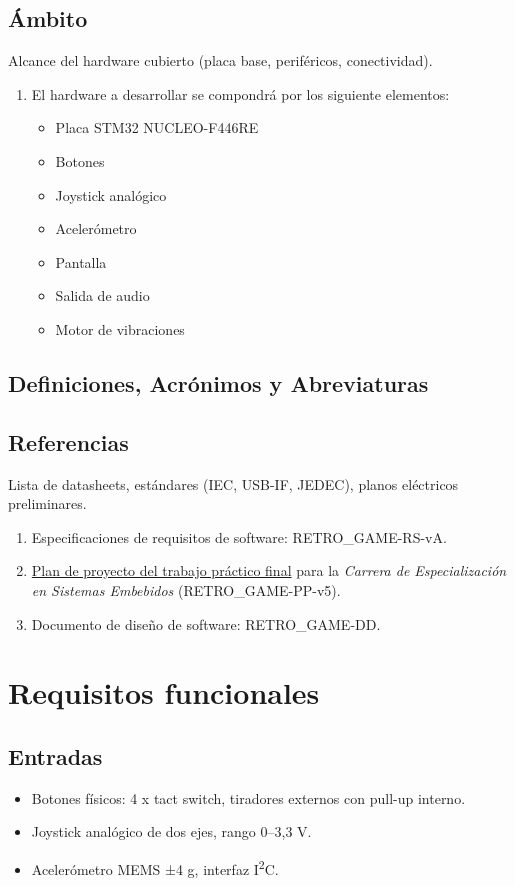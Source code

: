 \documentclass[11pt,a4paper]{article}
\begin{document}
\subsection{Ámbito}
Alcance del hardware cubierto (placa base, periféricos, conectividad).
\begin{enumerate}
  \item El hardware a desarrollar se compondrá por los siguiente elementos:
  \begin{itemize}
    \item Placa STM32 NUCLEO-F446RE
    \item Botones
    \item Joystick analógico
    \item Acelerómetro
    \item Pantalla
    \item Salida de audio
    \item Motor de vibraciones
  \end{itemize}
\end{enumerate}

\subsection{Definiciones, Acrónimos y Abreviaturas}

\subsection{Referencias}
Lista de datasheets, estándares (IEC, USB-IF, JEDEC), planos eléctricos preliminares.

\begin{enumerate}
  \item Especificaciones de requisitos de software: RETRO\_GAME-RS-vA.
  \item \href{https://drive.google.com/file/d/1C3vEYR8wME6EzlZVVC-gT2u86dwnoZA-/view?usp=sharing}{Plan de proyecto del trabajo práctico final} para la \textit{Carrera de Especialización en Sistemas Embebidos} (RETRO\_GAME-PP-v5). 
  \item Documento de diseño de software: RETRO\_GAME-DD.
\end{enumerate}

\section{Requisitos funcionales}
\subsection{Entradas}
\begin{itemize}
  \item Botones físicos: 4 x tact switch, tiradores externos con pull-up interno.
  \item Joystick analógico de dos ejes, rango 0–3,3 V.
  \item Acelerómetro MEMS ±4 g, interfaz I\textsuperscript{2}C.
\end{itemize}
\end{document}
